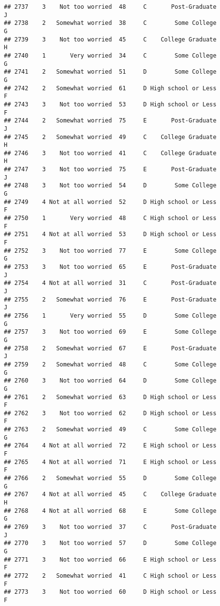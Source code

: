 \documentclass[
]{article}
\begin{document}
\begin{verbatim}
## 2737    3    Not too worried  48     C       Post-Graduate         J
## 2738    2   Somewhat worried  38     C        Some College         G
## 2739    3    Not too worried  45     C    College Graduate         H
## 2740    1       Very worried  34     C        Some College         G
## 2741    2   Somewhat worried  51     D        Some College         G
## 2742    2   Somewhat worried  61     D High school or Less         F
## 2743    3    Not too worried  53     D High school or Less         F
## 2744    2   Somewhat worried  75     E       Post-Graduate         J
## 2745    2   Somewhat worried  49     C    College Graduate         H
## 2746    3    Not too worried  41     C    College Graduate         H
## 2747    3    Not too worried  75     E       Post-Graduate         J
## 2748    3    Not too worried  54     D        Some College         G
## 2749    4 Not at all worried  52     D High school or Less         F
## 2750    1       Very worried  48     C High school or Less         F
## 2751    4 Not at all worried  53     D High school or Less         F
## 2752    3    Not too worried  77     E        Some College         G
## 2753    3    Not too worried  65     E       Post-Graduate         J
## 2754    4 Not at all worried  31     C       Post-Graduate         J
## 2755    2   Somewhat worried  76     E       Post-Graduate         J
## 2756    1       Very worried  55     D        Some College         G
## 2757    3    Not too worried  69     E        Some College         G
## 2758    2   Somewhat worried  67     E       Post-Graduate         J
## 2759    2   Somewhat worried  48     C        Some College         G
## 2760    3    Not too worried  64     D        Some College         G
## 2761    2   Somewhat worried  63     D High school or Less         F
## 2762    3    Not too worried  62     D High school or Less         F
## 2763    2   Somewhat worried  49     C        Some College         G
## 2764    4 Not at all worried  72     E High school or Less         F
## 2765    4 Not at all worried  71     E High school or Less         F
## 2766    2   Somewhat worried  55     D        Some College         G
## 2767    4 Not at all worried  45     C    College Graduate         H
## 2768    4 Not at all worried  68     E        Some College         G
## 2769    3    Not too worried  37     C       Post-Graduate         J
## 2770    3    Not too worried  57     D        Some College         G
## 2771    3    Not too worried  66     E High school or Less         F
## 2772    2   Somewhat worried  41     C High school or Less         F
## 2773    3    Not too worried  60     D High school or Less         F

\end{verbatim}
\end{document}
